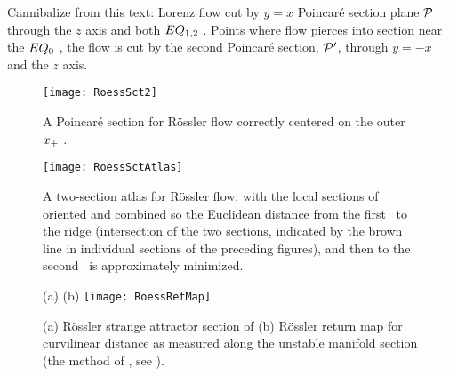 Cannibalize from this text:
Lorenz flow cut by  $y=x$ Poincar\'e section plane ${\cal P}$ through the
$z$ axis and both $EQ_{1,2}$ \eqva. Points where flow pierces into
section %
near the $EQ_{0}$ \eqv, the flow is cut by the second Poincar\'e
section,  ${\cal P}'$, through $y=-x$ and the $z$ axis.

\begin{figure}%
\begin{center}
  \texttt{[image: RoessSct2]}
\end{center}
  \caption[R\"ossler section, outer {\eqv}]{
  A Poincar\'e section for R\"ossler flow correctly centered on the outer
  {\eqv} $x_{+}$ \template.
  } \label{fig:RoessSct2}
\end{figure}

\begin{figure}%
\begin{center}
  \texttt{[image: RoessSctAtlas]}
\end{center}
  \caption{
  A two-section atlas for R\"ossler flow, with the local sections of
   oriented and combined so the
  Euclidean distance from the first \template\ to the ridge (intersection
  of the two sections, indicated by the brown line in individual sections
  of the preceding figures), and then to the second \template\ is
  approximately minimized.
  } \label{fig:RoessSctAtlas}
\end{figure}

\begin{figure}
\begin{center}
(a) %
(b) \texttt{[image: RoessRetMap]}
\end{center}
  \caption{
(a) R\"ossler strange attractor section of 
(b) R\"ossler return map for curvilinear distance as measured
along the unstable manifold section (the method of
, see ).
  }
\label{fig:RoessRetMap}
\end{figure}

